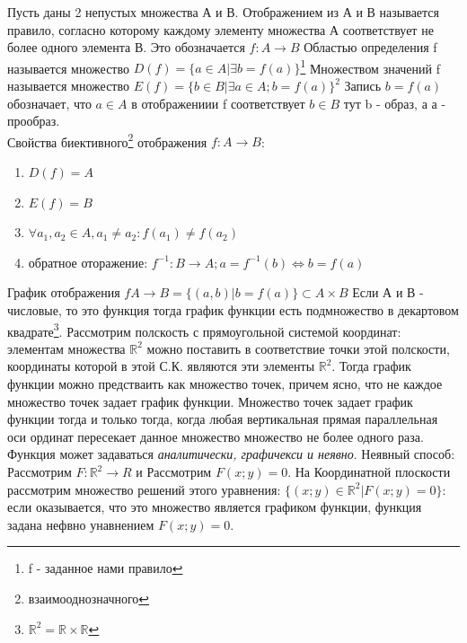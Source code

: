 \documentclass[oneside]{book}
\begin{document}
\begin{enumerate}
Пусть даны 2 непустых множества А и В. Отображением из А и В называется правило, согласно которому каждому элементу
множества А соответствует не более одного элемента В. Это обозначается $f : A \rightarrow B$
Областью определения f называется множество $D(f) = \{a \in A | \exists b = f(a)\}$\footnote{f - заданное нами правило}
Множеством значений f называется множество $E(f) = \{b \in B | \exists a \in A; b = f(a)\}^2$ Запись
$b = f(a)$ обозначает, что $a \in A$ в отображениии f соответствует $b \in B$ тут b - образ, а а - прообраз. \\
Свойства биективного\footnote{взаимооднозначного} отображения $f: A \rightarrow B$:
\begin{enumerate}
    \item $D(f) = A$
    \item $E(f) = B$
    \item $\forall a_1, a_2 \in A, a_1 \neq a_2: f(a_1) \neq f(a_2)$
    \item обратное оторажение: $f^{-1}: B \rightarrow A; a = f^{-1}(b) \Leftrightarrow b = f(a)$
\end{enumerate}
График отображения $f A \rightarrow B = \{(a, b) | b = f(a)\} \subset A \times B$ Если А и В - числовые, то это функция тогда
график функции есть подмножество в декартовом квадрате\footnote{$\mathbb{R}^2 = \mathbb{R} \times \mathbb{R}$}.
Рассмотрим полскость с прямоугольной системой координат: элементам множества $\mathbb{R}^2$ можно поставить в соответствие
точки этой полскости, координаты которой в этой С.К. являются  эти элементы $\mathbb{R}^2$. Тогда график функции можно предстваить как
множество точек, причем ясно, что не каждое множество точек задает график функции. Множество точек задает график функции тогда и только
тогда, когда любая вертикальная прямая параллельная оси ординат пересекает данное множество множество не более одного раза. Функция может задаваться
\textit{аналитически, графичекси и неявно}. Неявный способ: Рассмотрим $F : \mathbb{R}^2 \rightarrow R$ и Рассмотрим $F(x;y) = 0$.
На Координатной плоскости рассмотрим множество решений этого уравнения: $\{(x;y) \in \mathbb{R}^2 | F(x;y) = 0\}$: если оказывается, что
это множество является графиком функции, функция задана нефвно унавнением $F(x;y) = 0$.


\end{enumerate}
\end{document}
